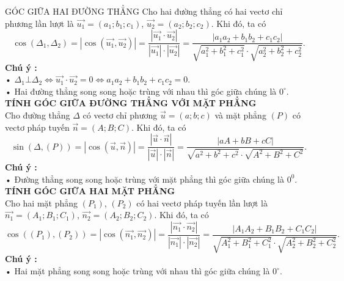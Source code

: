 \begin{dang}{GÓC GIỮA HAI ĐƯỜNG THẲNG}
	Cho hai đường thẳng có hai vectơ chỉ phương lần lượt là $\overrightarrow {u_1}=(a_1;{b_1};{c_1})$, $\overrightarrow{ u_2}=(a_2;{b_2};{c_2})$. Khi đó, ta có
	$$\cos\left(\Delta_1,\Delta_2\right)=\left|\cos\left(\overrightarrow {u_1}, \overrightarrow{ u_2} \right)\right|=\dfrac{\left|\overrightarrow {u_1}\cdot \overrightarrow{u_2}\right|}{\left|\overrightarrow {u_1}\right|\cdot \left|\overrightarrow {u_2}\right|}=\dfrac{\left|a_1a_2+b_1b_2+c_1c_2 \right| }{\sqrt{a_1^2+b_1^2+c_1^2}\cdot \sqrt{a_2^2+b_2^2+c_2^2}}.$$
	\textbf{Chú ý :}\\
	• $\Delta_1\bot{\Delta_2}\Leftrightarrow{\overrightarrow {u_1}}\cdot \overrightarrow {u_2}=0\Leftrightarrow{a_1}{a_2}+b_1b_2+c_1c_2=0.$\\
	• Hai đường thẳng song song hoặc trùng với nhau thì góc giữa chúng là $0^\circ$.\\
	\textbf{TÍNH GÓC GIỮA ĐƯỜNG THẲNG VỚI MẶT PHẲNG}\\
	Cho đường thẳng $\Delta $ có vectơ chỉ phương $\overrightarrow {u}=(a;b;c)$ và mặt phẳng $(P)$ có vectơ pháp tuyến $\overrightarrow {n}=(A; B; C)$. Khi đó, ta có
	$$\sin\left(\Delta ,(P)\right)=\left|\cos\left(\overrightarrow {u}, \overrightarrow{n}\right)\right|=\dfrac{\left|\overrightarrow {u} \cdot\overrightarrow {n}\right|}{\left|\overrightarrow {u}\right| \cdot \left| \overrightarrow {n}\right|}=\dfrac{\left|aA+bB+cC\right|}{\sqrt{a^2+b^2+c^2}\cdot \sqrt{A^2+B^2+C^2}}.$$
	\textbf{Chú ý :}\\
	• Đường thẳng song song hoặc trùng với mặt phẳng thì góc giữa chúng là $0^0$.\\
	\textbf{TÍNH GÓC GIỮA HAI MẶT PHẲNG}\\
	Cho hai mặt phẳng $(P_1)$, $(P_2)$ có hai vectơ pháp tuyến lần lượt là   $\overrightarrow{n_1}=(A_1;B_1;C_1)$, $ \overrightarrow{n_2}=(A_2;B_2;C_2)$. Khi đó, ta có
	$$ \cos\left((P_1),(P_2)\right)=\left|\cos\left( \overrightarrow{n_1} , \overrightarrow{n_2} \right)\right|=\dfrac{\left|\overrightarrow{n_1}\cdot \overrightarrow{n_2}\right|}{\left|\overrightarrow{n_1}\right|\cdot \left|\overrightarrow {n_2}\right|}=\dfrac{\left|A_1A_2+B_1B_2+C_1C_2\right|}{\sqrt{A_1^2+B_1^2+C_1^2}\cdot \sqrt{A_2^2+B_2^2+C_2^2}}.$$
	\textbf{Chú ý :}\\
	• Hai mặt phẳng song song hoặc trùng với nhau thì góc giữa chúng là $0^\circ$.
\end{dang}

